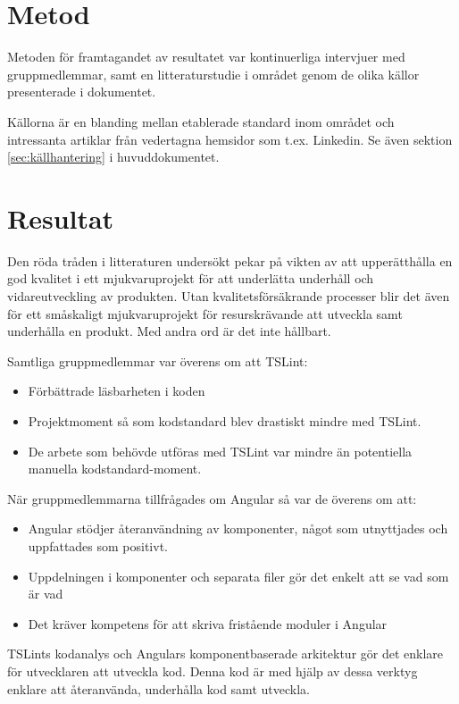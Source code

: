 \section{Metod}

Metoden för framtagandet av resultatet var kontinuerliga intervjuer med gruppmedlemmar, samt en litteraturstudie i området genom de olika källor presenterade i dokumentet.

Källorna är en blanding mellan etablerade standard inom området och intressanta artiklar från vedertagna hemsidor som t.ex. Linkedin. Se även sektion \ref{sec:källhantering} i huvuddokumentet.

\section{Resultat}

Den röda tråden i litteraturen undersökt pekar på vikten av att upperätthålla en god kvalitet i ett mjukvaruprojekt för att underlätta underhåll och vidareutveckling av produkten. Utan kvalitetsförsäkrande processer blir det även för ett småskaligt mjukvaruprojekt för resurskrävande att utveckla samt underhålla en produkt. Med andra ord är det inte hållbart.

Samtliga gruppmedlemmar var överens om att TSLint:

\begin{itemize}
	\item Förbättrade läsbarheten i koden
	\item Projektmoment så som kodstandard blev drastiskt mindre med TSLint.
	\item De arbete som behövde utföras med TSLint var mindre än potentiella manuella kodstandard-moment.
\end{itemize}

När gruppmedlemmarna tillfrågades om Angular så var de överens om att:

\begin{itemize}
	\item Angular stödjer återanvändning av komponenter, något som utnyttjades och uppfattades som positivt.
	\item Uppdelningen i komponenter och separata filer gör det enkelt att se vad som är vad
	\item Det kräver kompetens för att skriva fristående moduler i Angular
\end{itemize}

TSLints kodanalys och Angulars komponentbaserade arkitektur gör det enklare för utvecklaren att utveckla kod. Denna kod är med hjälp av dessa verktyg enklare att återanvända, underhålla kod samt utveckla.

